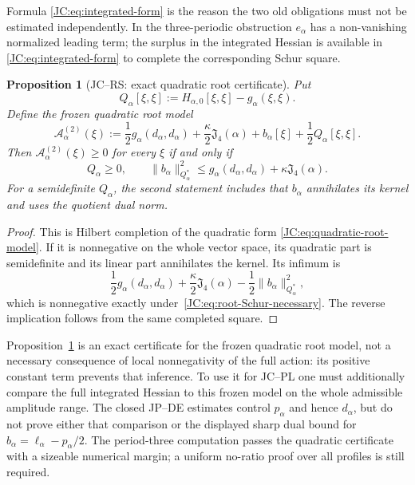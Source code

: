 \documentclass[11pt]{amsart}
\providecommand{\mathscr}{\mathcal}
\numberwithin{equation}{section}
\newtheorem{proposition}[theorem]{Proposition}
\theoremstyle{definition}
\theoremstyle{remark}
\newcommand{\Jfour}{\mathfrak J_4}
\providecommand{\mathscr}[1]{\mathcal{#1}}
\begin{document}
Formula \eqref{JC:eq:integrated-form} is the reason the two old obligations
must not be estimated independently.  In the three-periodic obstruction
$e_\alpha$ has a non-vanishing normalized leading term; the surplus in the
integrated Hessian is available in \eqref{JC:eq:integrated-form} to complete
the corresponding Schur square.

\begin{proposition}[JC--RS: exact quadratic root certificate]
\label{JC:prop:JC-RS}
Put
\begin{equation}\label{JC:eq:root-form}
 Q_\alpha[\xi,\xi]
 :=H_{\alpha,0}[\xi,\xi]-g_\alpha(\xi,\xi).
\end{equation}
Define the frozen quadratic root model
\begin{equation}\label{JC:eq:quadratic-root-model}
 \mathscr A_\alpha^{(2)}(\xi)
 :=\frac12g_\alpha(d_\alpha,d_\alpha)
   +\frac\kappa2\Jfour(\alpha)
   +b_\alpha[\xi]+\frac12Q_\alpha[\xi,\xi].
\end{equation}
Then $\mathscr A_\alpha^{(2)}(\xi)\ge0$ for every $\xi$ if and only if
\begin{equation}\label{JC:eq:root-Schur-necessary}
 \boxed{
 Q_\alpha\ge0,
 \qquad
 \|b_\alpha\|_{Q_\alpha^*}^2
 \le g_\alpha(d_\alpha,d_\alpha)
       +\kappa\Jfour(\alpha).}
\end{equation}
For a semidefinite $Q_\alpha$, the second statement includes that
$b_\alpha$ annihilates its kernel and uses the quotient dual norm.
\end{proposition}

\begin{proof}
This is Hilbert completion of the quadratic form
\eqref{JC:eq:quadratic-root-model}.  If it is nonnegative on the whole vector
space, its quadratic part is semidefinite and its linear part annihilates
the kernel.  Its infimum is
\[
 \frac12g_\alpha(d_\alpha,d_\alpha)
 +\frac\kappa2\Jfour(\alpha)
 -\frac12\|b_\alpha\|_{Q_\alpha^*}^2,
\]
which is nonnegative exactly under~\eqref{JC:eq:root-Schur-necessary}.  The
reverse implication follows from the same completed square.
\end{proof}

Proposition~\ref{JC:prop:JC-RS} is an exact certificate for the frozen
quadratic root model, not a necessary consequence of local nonnegativity
of the full action: its positive constant term prevents that inference.
To use it for JC--PL one must additionally compare the full integrated
Hessian to this frozen model on the whole admissible amplitude range.  The
closed JP--DE estimates control $p_\alpha$ and hence $d_\alpha$, but do not
prove either that comparison or the displayed sharp dual bound for
$b_\alpha=\ell_\alpha-p_\alpha/2$.  The period-three computation passes
the quadratic certificate with a sizeable numerical margin; a uniform
no-ratio proof over all profiles is still required.
\end{document}
